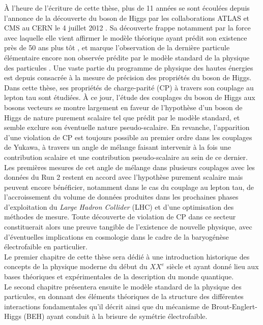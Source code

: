 
À l'heure de l'écriture de cette thèse, plus de 11 années se sont écoulées depuis l'annonce de la découverte du boson de Higgs par les collaborations ATLAS et CMS au CERN le 4 juillet 2012 \cite{ATLASdiscovery,CMSdiscovery}. Sa découverte frappe notamment par la force avec laquelle elle vient affirmer le modèle théorique ayant prédit son existence près de 50 ans plus tôt \cite{BE,H}, et marque l'observation de la dernière particule élémentaire encore non observée prédite par le modèle standard de la physique des particules \cite{SM1,SM2,SM3}. Une vaste partie du programme de physique des hautes énergies est depuis consacrée à la mesure de précision des propriétés du boson de Higgs. Dans cette thèse, ses propriétés de charge-parité (CP) à travers son couplage au lepton tau sont étudiées. À ce jour, l'étude des couplages du boson de Higgs aux bosons vecteurs se montre largement en faveur de l'hypothèse d'un boson de Higgs de nature purement scalaire tel que prédit par le modèle standard, et semble exclure son éventuelle nature pseudo-scalaire. En revanche, l'apparition d'une violation de CP est toujours possible au premier ordre dans les couplages de Yukawa, à travers un angle de mélange faisant intervenir à la fois une contribution scalaire et une contribution pseudo-scalaire au sein de ce dernier. Les premières mesures de cet angle de mélange dans plusieurs couplages \cite{ttH,Htautau} avec les données du Run 2 restent en accord avec l'hypothèse purement scalaire mais peuvent encore bénéficier, notamment dans le cas du couplage au lepton tau, de l'accroissement du volume de données produites dans les prochaines phases d'exploitation du \textit{Large Hadron Collider} (LHC) et d'une optimisation des méthodes de mesure. Toute découverte de violation de CP dans ce secteur constituerait alors une preuve tangible de l'existence de nouvelle physique, avec d'éventuelles implications en cosmologie dans le cadre de la baryogénèse électrofaible \cite{EWKbaryogenesis} en particulier. \\

Le premier chapitre de cette thèse sera dédié à une introduction historique des concepts de la physique moderne du début du $XX^e$ siècle et ayant donné lieu aux bases théoriques et expérimentales de la description du monde quantique. \\

Le second chapitre présentera ensuite le modèle standard de la physique des particules, en donnant des éléments théoriques de la structure des différentes interactions fondamentales qu'il décrit ainsi que du mécanisme de Brout-Englert-Higgs (BEH) ayant conduit à la brisure de symétrie électrofaible. \\

